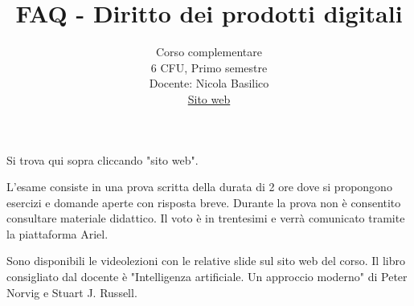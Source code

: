 \documentclass{article}
\title{FAQ - \textbf{Diritto dei prodotti digitali}}
\author{
	Corso complementare \\6 CFU, Primo semestre\\
	Docente: Nicola Basilico\\ 
	\href{http://nbasilicoia.ariel.ctu.unimi.it/.}{Sito web}
	\date{}
}
\begin{document}
 

\maketitle
	
\begin{QuestionList}
		
     {
        Si trova qui sopra cliccando "sito web".
	}
		
	 {
		 L'esame consiste in una prova scritta della durata di 2 ore dove si propongono
		 esercizi e domande aperte con risposta breve. Durante la prova non è consentito
		 consultare materiale didattico.
		 Il voto è in trentesimi e verrà comunicato tramite la piattaforma Ariel.
	}
		
	 {
		Sono disponibili le videolezioni con le relative slide sul sito web del corso.
		Il libro consigliato dal docente è "Intelligenza artificiale. Un approccio moderno"
		di Peter Norvig e Stuart J. Russell.
	}
		
	\end{QuestionList}
	
\end{document}
